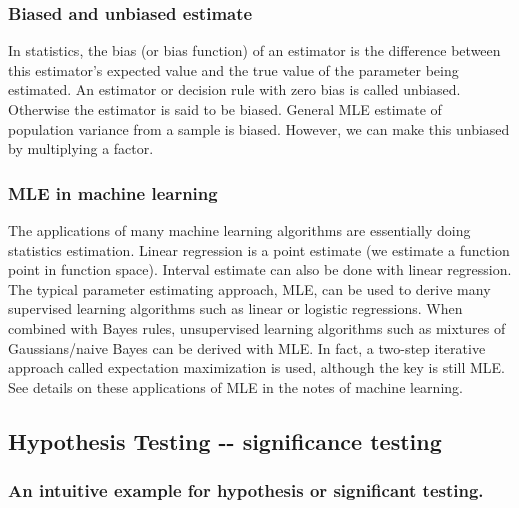 \documentclass[11pt]{article}
\begin{document}
\subsubsection{Biased and unbiased
estimate}\label{biased-and-unbiased-estimate}

In statistics, the bias (or bias function) of an estimator is the
difference between this estimator's expected value and the true value of
the parameter being estimated. An estimator or decision rule with zero
bias is called unbiased. Otherwise the estimator is said to be biased.
General MLE estimate of population variance from a sample is biased.
However, we can make this unbiased by multiplying a factor.

\subsubsection{MLE in machine learning}\label{mle-in-machine-learning}

The applications of many machine learning algorithms are essentially
doing statistics estimation. Linear regression is a point estimate (we
estimate a function point in function space). Interval estimate can also
be done with linear regression. The typical parameter estimating
approach, MLE, can be used to derive many supervised learning algorithms
such as linear or logistic regressions. When combined with Bayes rules,
unsupervised learning algorithms such as mixtures of Gaussians/naive
Bayes can be derived with MLE. In fact, a two-step iterative approach
called expectation maximization is used, although the key is still MLE.
See details on these applications of MLE in the notes of machine
learning.

    \subsection{Hypothesis Testing -\/- significance
testing}\label{hypothesis-testing----significance-testing}

    \subsubsection{An intuitive example for hypothesis or significant
testing.}\label{an-intuitive-example-for-hypothesis-or-significant-testing.}
\end{document}
